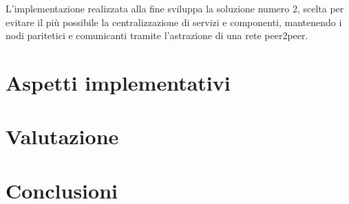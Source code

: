 \documentclass[10pt,a4paper]{article}
\begin{document}
L'implementazione realizzata alla fine sviluppa la soluzione numero 2, scelta per evitare il più possibile la centralizzazione di servizi e componenti, mantenendo i nodi paritetici e comunicanti tramite l'astrazione di una rete peer2peer. 

\section{Aspetti implementativi}

\section{Valutazione}

\section{Conclusioni}
\end{document}
